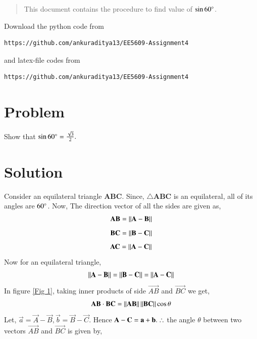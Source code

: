 \documentclass[journal,12pt,twocolumn]{IEEEtran}
\begin{document}
\begin{abstract}
This document contains the procedure to find value of $\sin60\degree$.
\end{abstract}
Download the python code from 
\begin{lstlisting}
https://github.com/ankuraditya13/EE5609-Assignment4
\end{lstlisting}
%
and latex-file codes from 
%
\begin{lstlisting}
https://github.com/ankuraditya13/EE5609-Assignment4
\end{lstlisting}

\section{Problem}
Show that $\sin60\degree = \frac{\sqrt{3}}{2}.$
\section{Solution}
Consider an equilateral triangle \textbf{ABC}. Since, $\triangle$\textbf{ABC} is an equilateral, all of its angles are $60\degree$. Now, The direction vector of all the sides are given as,
\begin{align}
\vec{AB}=\norm{\vec{A-B}}
\end{align}
\begin{align}
\vec{BC}=\norm{\vec{B-C}}
\end{align}  
\begin{align}
\vec{AC}=\norm{\vec{A-C}}
\end{align} 
Now for an equilateral triangle,
\begin{align}
\norm{\vec{A-B}} = \norm{\vec{B-C}} = \norm{\vec{A-C}}
\label{eq2}
\end{align}
In figure \ref{Fig 1}, taking inner products of side $\vec{AB}$ and $\vec{BC}$ we get,
\begin{align}
\vec{AB}\cdot\vec{BC} = \norm{\vec{AB}}\norm{\vec{BC}}\cos\theta
\label{eq3}
\end{align} 
Let, $ \vec{a} = \vec{A}-\vec{B}, \vec{b} = \vec{B}-\vec{C}$. Hence $\vec{A}-\vec{C} = \vec{a}+\vec{b}.\\\therefore$ the angle $\theta$ between two vectors  $\vec{AB}$ and $\vec{BC}$ is given by,

\end{document}
